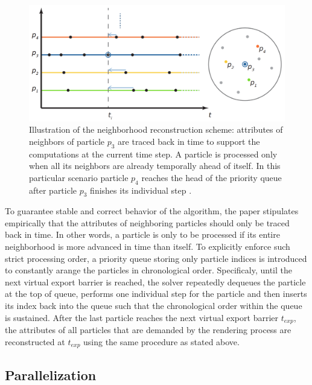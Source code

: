 \documentclass[
	11pt, 
	DIV10,
	ngerman,
	a4paper, 
	oneside, 
	headings=normal, 
	captions=tableheading,
	final, 
	numbers=noenddot
]{scrartcl}
\begin{document}
\begin{figure}[tb]
	\centering
	\includegraphics[scale=0.25]{images/5}
	\caption{\label{fig4} Illustration of the neighborhood reconstruction scheme: attributes of neighbors of particle $p_{3}$ are traced back in time to support the computations at the current time step. A particle is processed only when all its neighbors are already temporally ahead of itself. In this particular scenario particle $ p_{4} $ reaches the head of the priority queue after particle $p_{3}$ finishes its individual step \cite{reinhardt2017fully}.}
\end{figure}

To guarantee stable and correct behavior of the algorithm, the paper stipulates empirically that the attributes of neighboring particles should only be traced back in time. In other words, a particle is only to be processed if its entire neighborhood is more advanced in time than itself. To explicitly enforce such strict processing order, a priority queue storing only particle indices is introduced to constantly arange the particles in chronological order. Specificaly, until the next virtual export barrier is reached, the solver repeatedly dequeues the particle at the top of queue, performs one individual step for the particle and then inserts its index back into the queue such that the chronological order within the queue is sustained. After the last particle reaches the next virtual export barrier $t_{exp}$, the attributes of all particles that are demanded by the rendering process are reconstructed at $t_{exp}$ using the same procedure as stated above.

\subsection{Parallelization}
\end{document}
